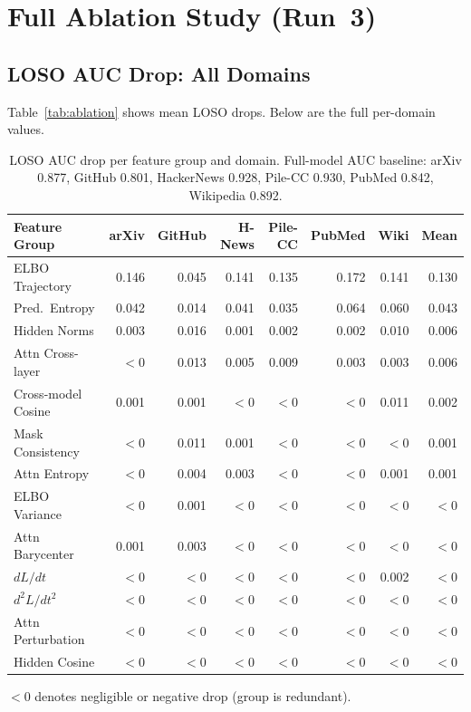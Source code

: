 \section{Full Ablation Study (Run~3)}
\label{app:ablation}

\subsection{LOSO AUC Drop: All Domains}



Table~\ref{tab:ablation} shows mean LOSO drops. Below are the full per-domain values.

\begin{table}[h]
\centering
\caption{LOSO AUC drop per feature group and domain. Full-model AUC baseline:
         arXiv 0.877, GitHub 0.801, HackerNews 0.928, Pile-CC 0.930,
         PubMed 0.842, Wikipedia 0.892.}
\label{tab:ablation_full}
\small
\begin{tabular}{l rrrrrr r}
\toprule
\textbf{Feature Group} & arXiv & GitHub & H-News & Pile-CC & PubMed & Wiki & Mean \\
\midrule
ELBO Trajectory     & 0.146 & 0.045 & 0.141 & 0.135 & 0.172 & 0.141 & 0.130 \\
Pred.\ Entropy      & 0.042 & 0.014 & 0.041 & 0.035 & 0.064 & 0.060 & 0.043 \\
Hidden Norms        & 0.003 & 0.016 & 0.001 & 0.002 & 0.002 & 0.010 & 0.006 \\
Attn Cross-layer    & $<$0 & 0.013 & 0.005 & 0.009 & 0.003 & 0.003 & 0.006 \\
Cross-model Cosine  & 0.001 & 0.001 & $<$0 & $<$0 & $<$0 & 0.011 & 0.002 \\
Mask Consistency    & $<$0 & 0.011 & 0.001 & $<$0 & $<$0 & $<$0 & 0.001 \\
Attn Entropy        & $<$0 & 0.004 & 0.003 & $<$0 & $<$0 & 0.001 & 0.001 \\
ELBO Variance       & $<$0 & 0.001 & $<$0 & $<$0 & $<$0 & $<$0 & $<$0 \\
Attn Barycenter     & 0.001 & 0.003 & $<$0 & $<$0 & $<$0 & $<$0 & $<$0 \\
$dL/dt$             & $<$0 & $<$0 & $<$0 & $<$0 & $<$0 & 0.002 & $<$0 \\
$d^2L/dt^2$         & $<$0 & $<$0 & $<$0 & $<$0 & $<$0 & $<$0 & $<$0 \\
Attn Perturbation   & $<$0 & $<$0 & $<$0 & $<$0 & $<$0 & $<$0 & $<$0 \\
Hidden Cosine       & $<$0 & $<$0 & $<$0 & $<$0 & $<$0 & $<$0 & $<$0 \\
\bottomrule
\end{tabular}
{\footnotesize $<$0 denotes negligible or negative drop (group is redundant).}
\end{table}


